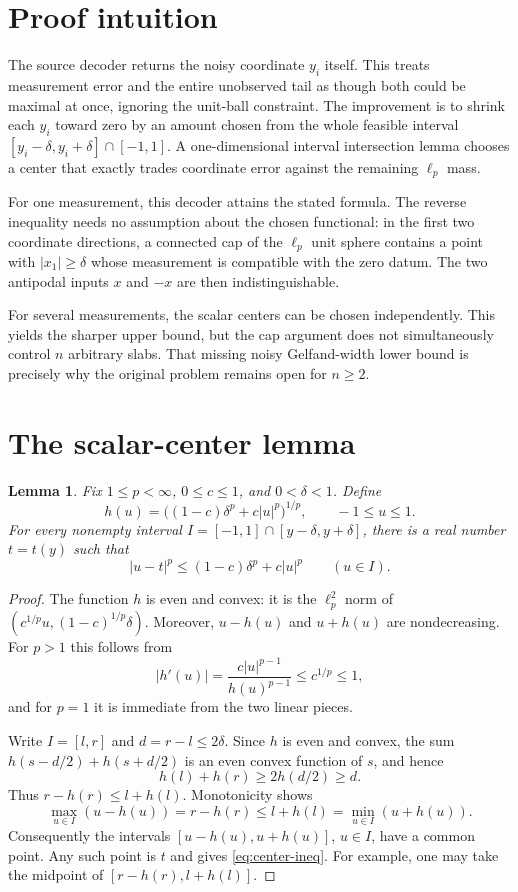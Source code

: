 \documentclass[11pt]{article}
\newtheorem{lemma}[theorem]{Lemma}
\begin{document}
\section{Proof intuition}
The source decoder returns the noisy coordinate $y_i$ itself.  This treats
measurement error and the entire unobserved tail as though both could be
maximal at once, ignoring the unit-ball constraint.  The improvement is to
shrink each $y_i$ toward zero by an amount chosen from the whole feasible
interval $[y_i-\delta,y_i+\delta]\cap[-1,1]$.  A one-dimensional interval
intersection lemma chooses a center that exactly trades coordinate error
against the remaining $\ell_p$ mass.

For one measurement, this decoder attains the stated formula.  The reverse
inequality needs no assumption about the chosen functional: in the first two
coordinate directions, a connected cap of the $\ell_p$ unit sphere contains
a point with $|x_1|\geq\delta$ whose measurement is compatible with the zero
datum.  The two antipodal inputs $x$ and $-x$ are then indistinguishable.

For several measurements, the scalar centers can be chosen independently.
This yields the sharper upper bound, but the cap argument does not
simultaneously control $n$ arbitrary slabs.  That missing noisy
Gelfand-width lower bound is precisely why the original problem remains open
for $n\geq2$.

\section{The scalar-center lemma}
\begin{lemma}\label{lem:center}
Fix $1\leq p<\infty$, $0\leq c\leq1$, and $0<\delta<1$.  Define
\[
 h(u)=\bigl((1-c)\delta^p+c|u|^p\bigr)^{1/p},\qquad -1\leq u\leq1.
\]
For every nonempty interval
$I=[-1,1]\cap[y-\delta,y+\delta]$, there is a real number $t=t(y)$ such
that
\begin{equation}\label{eq:center-ineq}
 |u-t|^p\leq (1-c)\delta^p+c|u|^p
 \qquad (u\in I).
\end{equation}
\end{lemma}
\begin{proof}
The function $h$ is even and convex: it is the $\ell_p^2$ norm of
$(c^{1/p}u,(1-c)^{1/p}\delta)$.  Moreover, $u-h(u)$ and $u+h(u)$ are
nondecreasing.  For $p>1$ this follows from
\[
 |h'(u)|=\frac{c|u|^{p-1}}{h(u)^{p-1}}\leq c^{1/p}\leq1,
\]
and for $p=1$ it is immediate from the two linear pieces.

Write $I=[l,r]$ and $d=r-l\leq2\delta$.  Since $h$ is even and convex,
the sum $h(s-d/2)+h(s+d/2)$ is an even convex function of $s$, and hence
\[
 h(l)+h(r)\geq2h(d/2)\geq d.
\]
Thus $r-h(r)\leq l+h(l)$.  Monotonicity shows
\[
 \max_{u\in I}(u-h(u))=r-h(r)
 \leq l+h(l)=\min_{u\in I}(u+h(u)).
\]
Consequently the intervals $[u-h(u),u+h(u)]$, $u\in I$, have a common
point.  Any such point is $t$ and gives \eqref{eq:center-ineq}.  For example,
one may take the midpoint of $[r-h(r),l+h(l)]$.
\end{proof}
\end{document}
